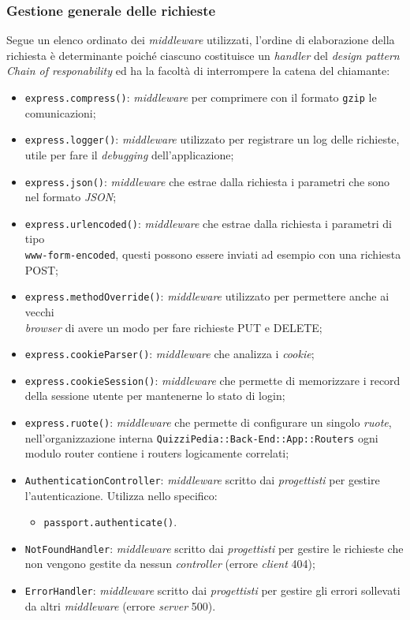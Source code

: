 \subsubsection{Gestione generale delle richieste}
Segue un elenco ordinato dei \textit{middleware} utilizzati, l'ordine di elaborazione della richiesta è determinante poiché ciascuno costituisce un \textit{handler} del \textit{design pattern} \textit{Chain of responability} ed ha la facoltà di interrompere la catena del chiamante:

\begin{itemize}
	\item \texttt{express.compress()}: \textit{middleware} per comprimere con il formato \texttt{gzip} le comunicazioni;
	\item \texttt{express.logger()}: \textit{middleware} utilizzato per registrare un log delle richieste, utile per fare il \textit{debugging} dell'applicazione;
	\item \texttt{express.json()}: \textit{middleware} che estrae dalla richiesta i parametri che sono nel formato \textit{JSON};
	\item \texttt{express.urlencoded()}: \textit{middleware} che estrae dalla richiesta i parametri di tipo \\ \texttt{www-form-encoded}, questi possono essere inviati ad esempio con una richiesta POST;
	\item \texttt{express.methodOverride()}: \textit{middleware} utilizzato per permettere anche ai vecchi \\ \textit{browser} di avere un modo per fare richieste PUT e DELETE;
	\item \texttt{express.cookieParser()}: \textit{middleware} che analizza i \textit{cookie};
	\item \texttt{express.cookieSession()}: \textit{middleware} che permette di memorizzare i record della sessione utente per mantenerne lo stato di login;
	\item \texttt{express.ruote()}: \textit{middleware} che permette di configurare un singolo \textit{ruote}, nell'organizzazione interna \texttt{QuizziPedia::Back-End::App::Routers} ogni modulo router contiene i routers logicamente correlati;
	\item \texttt{AuthenticationController}: \textit{middleware} scritto dai \textit{progettisti} per gestire l'autenticazione. Utilizza nello specifico:
			\begin{itemize}
				\item \texttt{passport.authenticate()}.
			\end{itemize}
	\item \texttt{NotFoundHandler}: \textit{middleware} scritto dai \textit{progettisti} per gestire le richieste che non vengono gestite da nessun \textit{controller} (errore \textit{client} 404);
	\item \texttt{ErrorHandler}: \textit{middleware} scritto dai \textit{progettisti} per gestire gli errori sollevati da altri \textit{middleware} (errore \textit{server} 500).
\end{itemize}

